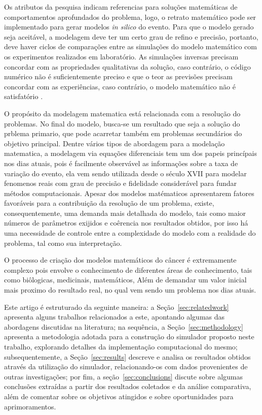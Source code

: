 \documentclass[12pt]{article}
\begin{document}
Os atributos da pesquisa indicam referencias para soluções matemáticas de comportamentos aprofundados do problema, logo, o retrato matemático pode ser implementado para gerar modelos \textit{in silico} do evento. Para que o modelo gerado seja aceitável, a modelagem deve ter um certo grau de refino e precisão, portanto, deve haver ciclos de comparações entre as simulações do modelo matemático com os experimentos realizados em laboratório. As simulações inversas precisam concordar com as propriedades qualitativas da solução, caso contrário, o código numérico não é suficientemente preciso e que o teor as previsões precisam concordar com as experiências, caso contrário, o modelo matemático não é satisfatório \cite{Preziosi2003}. %

O propósito da modelagem matematica está relacionada com a resolução do problemas. No final do modelo, busca-se um resultado que seja a solução do prblema primario, que pode acarretar também em problemas secundários do objetivo principal. Dentre vários tipos de abordagem para a modelação matematica, a modelagem via equações diferenciais tem um dos papeis princípais nos dias atuais, pois é facilmente observável as informações sobre a taxa de variação do evento, ela vem sendo utilizada desde o século XVII para modelar fenomenos reais com grau de precisão e fidelidade considerável para fundar métodos computacionais.
Apesar dos modelos matématicos apresentarem fatores favoráveis para a contribuição da resolução de um problema, existe, consequentemente, uma demanda mais detalhada do modelo, tais como maior números de parâmetros exijidos e coêrencia nos resultados obtidos, por isso há uma necessidade de controle entre a complexidade do modelo com a realidade do problema, tal como sua interpretação.

O processo de criação dos modelos matemáticos do câncer é extremamente complexo pois envolve o conhecimento de diferentes áreas de conhecimento, tais como biôlogicas, medicinais, matemáticos, Além de demandar um valor inicial mais proximo do resultado real, no qual vem sendo um problema nos dias atuais.

Este artigo é estruturado da seguinte maneira: a Seção~\ref{sec:relatedwork} apresenta alguns trabalhos relacionados a este, apontando algumas das abordagens discutidas na literatura; na sequência, a Seção~\ref{sec:methodology} apresenta a metodologia adotada para a construção do simulador proposto neste trabalho, explorando detalhes da implementação computacional do mesmo; subsequentemente, a Seção~\ref{sec:results} descreve e analisa os resultados obtidos através da utilização do simulador, relacionando-os com dados provenientes de outras investigações; por fim, a seção~\ref{sec:conclusions} discute sobre algumas conclusões extraídas a partir dos resultados coletados e da análise comparativa, além de comentar sobre os objetivos atingidos e sobre oportunidades para aprimoramentos.
\end{document}
